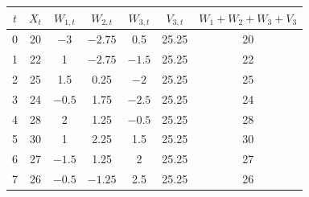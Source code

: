 \begin{tabular}{ccccccc}
\toprule
$t$ & $X_t$ & $W_{1,t}$ & $W_{2,t}$ & $W_{3,t}$ & $V_{3,t}$ & $W_1{+}W_2{+}W_3{+}V_3$ \\
\midrule
0 & 20 & $-3$ & $-2.75$ & 0.5 & 25.25 & 20 \\
1 & 22 & 1 & $-2.75$ & $-1.5$ & 25.25 & 22 \\
2 & 25 & 1.5 & 0.25 & $-2$ & 25.25 & 25 \\
3 & 24 & $-0.5$ & 1.75 & $-2.5$ & 25.25 & 24 \\
4 & 28 & 2 & 1.25 & $-0.5$ & 25.25 & 28 \\
5 & 30 & 1 & 2.25 & 1.5 & 25.25 & 30 \\
6 & 27 & $-1.5$ & 1.25 & 2 & 25.25 & 27 \\
7 & 26 & $-0.5$ & $-1.25$ & 2.5 & 25.25 & 26 \\
\bottomrule
\end{tabular}